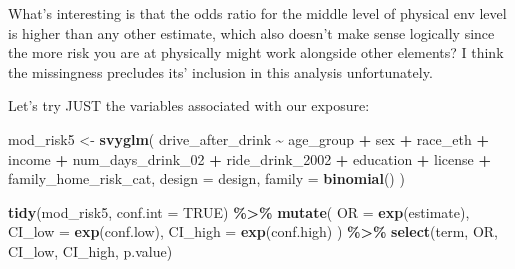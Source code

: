 \documentclass[
]{article}
\newenvironment{Shaded}{\begin{snugshade}}{\end{snugshade}}
\newcommand{\AttributeTok}[1]{\textcolor[rgb]{0.13,0.29,0.53}{#1}}
\newcommand{\ConstantTok}[1]{\textcolor[rgb]{0.56,0.35,0.01}{#1}}
\newcommand{\FunctionTok}[1]{\textcolor[rgb]{0.13,0.29,0.53}{\textbf{#1}}}
\newcommand{\NormalTok}[1]{#1}
\newcommand{\OtherTok}[1]{\textcolor[rgb]{0.56,0.35,0.01}{#1}}
\newcommand{\SpecialCharTok}[1]{\textcolor[rgb]{0.81,0.36,0.00}{\textbf{#1}}}
\begin{document}
What's interesting is that the odds ratio for the middle level of
physical env level is higher than any other estimate, which also doesn't
make sense logically since the more risk you are at physically might
work alongside other elements? I think the missingness precludes its'
inclusion in this analysis unfortunately.

Let's try JUST the variables associated with our exposure:

\begin{Shaded}
\begin{Highlighting}[]
\NormalTok{mod\_risk5 }\OtherTok{\textless{}{-}} \FunctionTok{svyglm}\NormalTok{(}
\NormalTok{  drive\_after\_drink }\SpecialCharTok{\textasciitilde{}}\NormalTok{ age\_group }\SpecialCharTok{+}\NormalTok{ sex }\SpecialCharTok{+}\NormalTok{ race\_eth }\SpecialCharTok{+}\NormalTok{ income }\SpecialCharTok{+} 
\NormalTok{     num\_days\_drink\_02 }\SpecialCharTok{+}\NormalTok{ ride\_drink\_2002 }\SpecialCharTok{+}\NormalTok{ education }\SpecialCharTok{+}\NormalTok{ license }\SpecialCharTok{+}
\NormalTok{    family\_home\_risk\_cat,}
  \AttributeTok{design =}\NormalTok{ design,}
  \AttributeTok{family =} \FunctionTok{binomial}\NormalTok{()}
\NormalTok{) }

\FunctionTok{tidy}\NormalTok{(mod\_risk5, }\AttributeTok{conf.int =} \ConstantTok{TRUE}\NormalTok{) }\SpecialCharTok{\%\textgreater{}\%}
  \FunctionTok{mutate}\NormalTok{(}
    \AttributeTok{OR =} \FunctionTok{exp}\NormalTok{(estimate),}
    \AttributeTok{CI\_low =} \FunctionTok{exp}\NormalTok{(conf.low),}
    \AttributeTok{CI\_high =} \FunctionTok{exp}\NormalTok{(conf.high)}
\NormalTok{  ) }\SpecialCharTok{\%\textgreater{}\%}
  \FunctionTok{select}\NormalTok{(term, OR, CI\_low, CI\_high, p.value) }
\end{Highlighting}
\end{Shaded}
\end{document}
